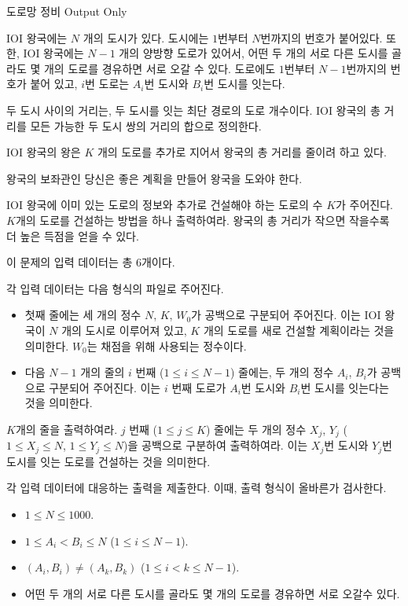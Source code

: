 \begin{problem}{도로망 정비}
	{}{Output Only}
	{}{}{}
	
	IOI 왕국에는 $N$ 개의 도시가 있다. 도시에는 $1$번부터 $N$번까지의 번호가 붙어있다. 또한, IOI 왕국에는 $N-1$ 개의 양방향 도로가 있어서, 어떤 두 개의 서로 다른 도시를 골라도 몇 개의 도로를 경유하면 서로 오갈 수 있다. 도로에도 $1$번부터 $N-1$번까지의 번호가 붙어 있고, $i$번 도로는 $A_i$번 도시와 $B_i$번 도시를 잇는다.
	
	두 도시 사이의 거리는, 두 도시를 잇는 최단 경로의 도로 개수이다. IOI 왕국의 총 거리를 모든 가능한 두 도시 쌍의 거리의 합으로 정의한다.
	
	IOI 왕국의 왕은 $K$ 개의 도로를 추가로 지어서 왕국의 총 거리를 줄이려 하고 있다.
	
	왕국의 보좌관인 당신은 좋은 계획을 만들어 왕국을 도와야 한다.
 	
 	
 	IOI 왕국에 이미 있는 도로의 정보와 추가로 건설해야 하는 도로의 수 $K$가 주어진다. $K$개의 도로를 건설하는 방법을 하나 출력하여라. 왕국의 총 거리가 작으면 작을수록 더 높은 득점을 얻을 수 있다.
 	

\InputFile


이 문제의 입력 데이터는 총 6개이다.

각 입력 데이터는 다음 형식의 파일로 주어진다.

\begin{itemize}
	\item 첫째 줄에는 세 개의 정수 $N$, $K$, $W_0$가 공백으로 구분되어 주어진다. 이는 IOI 왕국이 $N$ 개의 도시로 이루어져 있고, $K$ 개의 도로를 새로 건설할 계획이라는 것을 의미한다. $W_0$는 채점을 위해 사용되는 정수이다.
	\item 다음 $N-1$ 개의 줄의 $i$ 번째 ($1 \le i \le N-1$) 줄에는, 두 개의 정수 $A_i$, $B_i$가 공백으로 구분되어 주어진다. 이는 $i$ 번째 도로가 $A_i$번 도시와 $B_i$번 도시를 잇는다는 것을 의미한다.
\end{itemize}


\OutputFile

$K$개의 줄을 출력하여라. $j$ 번째 ($1 \le j \le K$) 줄에는 두 개의 정수 $X_j$, $Y_j$ ($1 \le X_j \le N$, $1 \le Y_j \le N$)을 공백으로 구분하여 출력하여라. 이는 $X_j$번 도시와 $Y_j$번 도시를 잇는 도로를 건설하는 것을 의미한다.

각 입력 데이터에 대응하는 출력을 제출한다. 이때, 출력 형식이 올바른가 검사한다.


\Constraints

\begin{itemize}
	\item $1 \le N \le 1000$.
	\item $1 \le A_i < B_i \le N$ ($1 \le i \le N-1$).
	\item $(A_i , B_i) \ne (A_k, B_k)$ ($1 \le i < k \le N-1$).
	\item 어떤 두 개의 서로 다른 도시를 골라도 몇 개의 도로를 경유하면 서로 오갈수 있다.
	

\end{itemize}
\end{problem}
